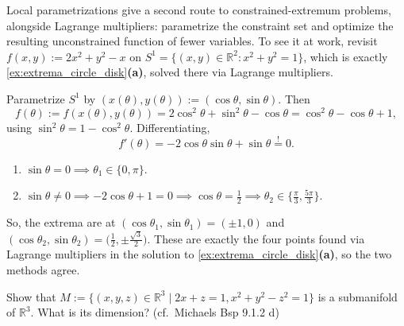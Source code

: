 \begin{remark}
Local parametrizations give a second route to constrained-extremum problems, alongside Lagrange
multipliers: parametrize the constraint set and optimize the resulting unconstrained function of
fewer variables. To see it at work, revisit $f(x,y) := 2x^2+y^2-x$ on
$S^1 = \{(x,y)\in\mathbb{R}^2 : x^2+y^2=1\}$, which is exactly \cref{ex:extrema_circle_disk}\textbf{(a)}, solved
there via Lagrange multipliers.

Parametrize $S^1$ by $(x(\theta),y(\theta)) := (\cos\theta,\sin\theta)$. Then
\[f(\theta) := f(x(\theta),y(\theta)) = 2\cos^2\theta+\sin^2\theta-\cos\theta = \cos^2\theta-\cos\theta+1,\]
using $\sin^2\theta = 1-\cos^2\theta$. Differentiating,
\[f'(\theta) = -2\cos\theta\sin\theta+\sin\theta \overset{!}{=} 0.\]
\begin{enumerate}[label=\textbf{(\alph*)}]
  \item $\sin\theta = 0 \implies \theta_1 \in \{0,\pi\}$.
  \item $\sin\theta \neq 0 \implies -2\cos\theta+1=0 \implies \cos\theta = \tfrac12 \implies
    \theta_2 \in \{\tfrac{\pi}{3},\tfrac{5\pi}{3}\}$.
\end{enumerate}
So, the extrema are at $(\cos\theta_1,\sin\theta_1) = (\pm1,0)$ and
$(\cos\theta_2,\sin\theta_2) = \big(\tfrac12,\pm\tfrac{\sqrt3}{2}\big)$. These are exactly the
four points found via Lagrange multipliers in the solution to \cref{ex:extrema_circle_disk}\textbf{(a)}, so the
two methods agree.
\end{remark}

\begin{exercise}
\label{ex:dimension_submanifold_system}
Show that $M := \{(x,y,z) \in \mathbb{R}^3 \mid 2x+z=1, x^2+y^2-z^2=1\}$ is a submanifold of $\mathbb{R}^3$. What is its dimension? (cf.\ Michaels Bsp 9.1.2 d)
\end{exercise}

